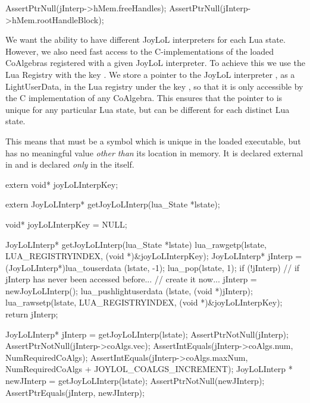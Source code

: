   AssertPtrNull(jInterp->hMem.freeHandles);
  AssertPtrNull(jInterp->hMem.rootHandleBlock);
\stopCTest
\stopTestCase
\stopTestSuite


We want the ability to have different JoyLoL interpreters for each Lua 
state. However, we also need fast access to the C-implementations of the 
loaded CoAlgebras registered with a given JoyLoL interpreter. To achieve 
this we use the Lua Registry with the  key 
. We store a pointer to the JoyLoL interpreter 
, as a LightUserData, in the Lua registry under the key 
, so that it is only accessible by the C 
implementation of any CoAlgebra. This ensures that the pointer to 
 is unique for any particular Lua state, but can be 
different for each distinct Lua state. 

This means that  must be a symbol which is unique in 
the loaded executable, but has no meaningful value \emph{other than} its 
location in memory. It is declared external in  and is 
declared \emph{only} in the  itself. 

\startCHeader
extern void* joyLoLInterpKey;

extern JoyLoLInterp* getJoyLoLInterp(lua_State *lstate);
\stopCHeader

\startCCode
void* joyLoLInterpKey = NULL;

JoyLoLInterp* getJoyLoLInterp(lua_State *lstate) {
  lua_rawgetp(lstate, LUA_REGISTRYINDEX, (void *)&joyLoLInterpKey);
  JoyLoLInterp* jInterp = (JoyLoLInterp*)lua_touserdata (lstate, -1);
  lua_pop(lstate, 1);
  if (!jInterp) {
    // if jInterp has never been accessed before... 
    // create it now...
    jInterp = newJoyLoLInterp();
    lua_pushlightuserdata (lstate, (void *)jInterp);
    lua_rawsetp(lstate, LUA_REGISTRYINDEX, (void *)&joyLoLInterpKey);
  }
  return jInterp;
}
\stopCCode


\startCTest
  JoyLoLInterp* jInterp = getJoyLoLInterp(lstate);
  AssertPtrNotNull(jInterp);
  AssertPtrNotNull(jInterp->coAlgs.vec);
  AssertIntEquals(jInterp->coAlgs.num, NumRequiredCoAlgs);
  AssertIntEquals(jInterp->coAlgs.maxNum,
    NumRequiredCoAlgs + JOYLOL_COALGS_INCREMENT);
  JoyLoLInterp * newJInterp = getJoyLoLInterp(lstate);
  AssertPtrNotNull(newJInterp);
  AssertPtrEquals(jInterp, newJInterp);
\stopCTest
\stopTestCase
\stopTestSuite

